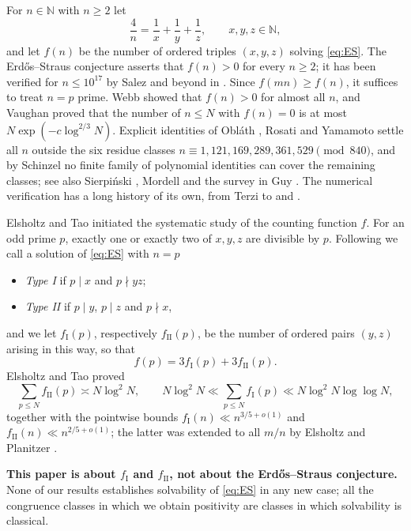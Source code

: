\documentclass[11pt,reqno]{amsart}
\theoremstyle{plain}
\theoremstyle{definition}
\numberwithin{equation}{section}
\newcommand{\N}{\mathbb{N}}
\newcommand{\fI}{f_{\mathrm{I}}}
\newcommand{\fII}{f_{\mathrm{II}}}
\begin{document}
For $n\in\N$ with $n\ge2$ let
\begin{equation}\label{eq:ES}
  \frac4n=\frac1x+\frac1y+\frac1z,\qquad x,y,z\in\N,
\end{equation}
and let $f(n)$ be the number of ordered triples $(x,y,z)$ solving \eqref{eq:ES}.
The Erd\H{o}s--Straus conjecture asserts that $f(n)>0$ for every $n\ge2$; it has been
verified for $n\le 10^{17}$ by Salez \cite{Salez} and beyond in \cite{MihneaDumitru}.
Since $f(mn)\ge f(n)$, it suffices to treat $n=p$ prime. Webb \cite{Webb} showed that
$f(n)>0$ for almost all $n$, and Vaughan \cite{Vaughan} proved that the number of
$n\le N$ with $f(n)=0$ is at most $N\exp(-c\log^{2/3}N)$. Explicit identities of
Obl\'ath \cite{Oblath}, Rosati \cite{Rosati} and Yamamoto \cite{Yamamoto} settle all
$n$ outside the six residue classes $n\equiv1,121,169,289,361,529\pmod{840}$, and by
Schinzel \cite{Schinzel1956,Schinzel} no finite family of polynomial identities can
cover the remaining classes; see also Sierpi\'nski \cite{Sierpinski}, Mordell
\cite[pp.~287--290]{Mordell} and the survey in Guy \cite[\S D11]{Guy}. The numerical
verification has a long history of its own, from Terzi \cite{Terzi} to \cite{Salez}
and \cite{MihneaDumitru}.

Elsholtz and Tao \cite{ElsholtzTao} initiated the systematic study of the counting
function $f$. For an odd prime $p$, exactly one or exactly two of $x,y,z$ are
divisible by $p$. Following \cite{ElsholtzTao} we call a solution of \eqref{eq:ES}
with $n=p$
\begin{itemize}
\item \emph{Type I} if $p\mid x$ and $p\nmid yz$;
\item \emph{Type II} if $p\mid y$, $p\mid z$ and $p\nmid x$,
\end{itemize}
and we let $\fI(p)$, respectively $\fII(p)$, be the number of ordered pairs $(y,z)$
arising in this way, so that
\begin{equation}\label{eq:split}
  f(p)=3\fI(p)+3\fII(p).
\end{equation}
Elsholtz and Tao proved
\[
  \sum_{p\le N}\fII(p)\asymp N\log^{2}N,\qquad
  N\log^{2}N\ll\sum_{p\le N}\fI(p)\ll N\log^{2}N\log\log N,
\]
together with the pointwise bounds $\fI(n)\ll n^{3/5+o(1)}$ and
$\fII(n)\ll n^{2/5+o(1)}$; the latter was extended to all $m/n$ by Elsholtz and
Planitzer \cite{ElsholtzPlanitzer}.

\medskip
\noindent\textbf{This paper is about $\fI$ and $\fII$, not about the Erd\H{o}s--Straus
conjecture.} None of our results establishes solvability of \eqref{eq:ES} in any new
case; all the congruence classes in which we obtain positivity are classes in which
solvability is classical.
\end{document}

